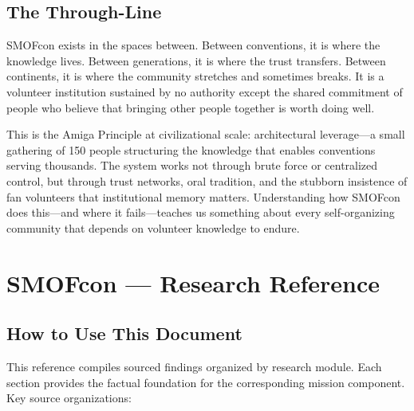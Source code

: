 \documentclass[11pt,letterpaper]{article}
\newcommand{\stageheader}[2]{%
  \noindent\colorbox{#2}{\makebox[\textwidth][l]{%
    \textcolor{white}{\bfseries\sffamily\hspace{6pt}#1\hspace{6pt}}}}%
  \vspace{0.5em}\par%
}
\begin{document}
\subsection{The Through-Line}

SMOFcon exists in the spaces between. Between conventions, it is where the knowledge lives. Between generations, it is where the trust transfers. Between continents, it is where the community stretches and sometimes breaks. It is a volunteer institution sustained by no authority except the shared commitment of people who believe that bringing other people together is worth doing well.

This is the Amiga Principle at civilizational scale: architectural leverage---a small gathering of 150 people structuring the knowledge that enables conventions serving thousands. The system works not through brute force or centralized control, but through trust networks, oral tradition, and the stubborn insistence of fan volunteers that institutional memory matters. Understanding how SMOFcon does this---and where it fails---teaches us something about every self-organizing community that depends on volunteer knowledge to endure.

\newpage

\stageheader{STAGE 2 --- RESEARCH REFERENCE}{secondary}

\section{SMOFcon --- Research Reference}

\subsection{How to Use This Document}

This reference compiles sourced findings organized by research module. Each section provides the factual foundation for the corresponding mission component. Key source organizations:
\end{document}

